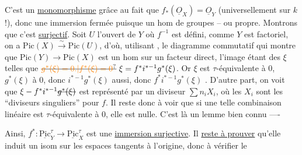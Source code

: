 C'est un \uline{monomorphisme} grâce au fait que
$f_*(\underline{O}_X)=\underline{O}_Y$ (universellement sur $k$ !), donc une
immersion fermée puisque un hom de groupes
-- ou  propre. Montrons que c'est
\uline{surjectif}. Soit $U$ l'ouvert de $Y$ où $f^{-1}$ est
défini, comme $Y$ est factoriel, on a
$\mathrm{Pic}(X)\overset{\sim}{\longrightarrow}\mathrm{Pic}(U)$, d'où, utilisant
, le diagramme commutatif
qui montre que $\mathrm{Pic}(Y)\to\mathrm{Pic}(X)$ est un hom
sur un facteur direct, l'image étant  des
$\xi$ telles que $\deleted{\unsure{g^*(\xi)=0.|f^*(\xi)=0}}\ \xi=f^*i^{*-1}g^*(\xi)$. Or
$\xi$ est  $\tau$-équivalente à $0$,   $g^*(\xi)$
  à $0$, donc $i^{*-1}g^*(\xi)$  aussi,
donc  $f^*i^{*-1}g^*(\xi)$  . D'autre part, on voit que
$\xi-f^*i^{*-1}\deleted{g^*(\xi)}$  est représenté par un
diviseur $\sum n_i X_i$, où les $X_i$ sont les ``diviseurs
singuliers'' pour $f$. Il reste donc à voir que si
une telle combinaison linéaire est 
$\tau$-équivalente à $0$, elle est nulle.  C'est là
un lemme bien connu ----

Ainsi, $f^*:\underline{\mathrm{Pic}}^\tau_Y\to\underline{\mathrm{Pic}}^\tau_X$ est une \uline{immersion
surjective}. Il \uline{reste à prouver} qu'elle induit
un isom sur les espaces tangents à l'origine,
donc à vérifier le

